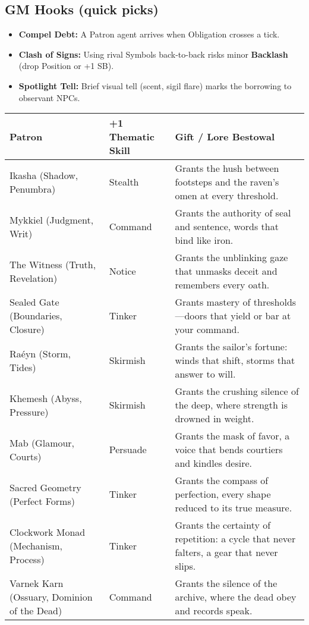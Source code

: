 \subsection*{GM Hooks (quick picks)}
\begin{itemize}
  \item \textbf{Compel Debt:} A Patron agent arrives when Obligation crosses a tick.
  \item \textbf{Clash of Signs:} Using rival Symbols back-to-back risks minor \textbf{Backlash} (drop Position or +1 SB).
  \item \textbf{Spotlight Tell:} Brief visual tell (scent, sigil flare) marks the borrowing to observant NPCs.
\end{itemize}

\begin{table}[H]
\centering
\renewcommand{\arraystretch}{1.15}
\begin{tabular}{@{}p{3.8cm}p{3.8cm}p{7.5cm}@{}}
\toprule
\textbf{Patron} & \textbf{+1 Thematic Skill} & \textbf{Gift / Lore Bestowal} \\
\midrule
Ikasha (Shadow, Penumbra) & Stealth & Grants the hush between footsteps and the raven’s omen at every threshold. \\
Mykkiel (Judgment, Writ) & Command & Grants the authority of seal and sentence, words that bind like iron. \\
The Witness (Truth, Revelation) & Notice & Grants the unblinking gaze that unmasks deceit and remembers every oath. \\
Sealed Gate (Boundaries, Closure) & Tinker & Grants mastery of thresholds—doors that yield or bar at your command. \\
Raéyn (Storm, Tides) & Skirmish & Grants the sailor’s fortune: winds that shift, storms that answer to will. \\
Khemesh (Abyss, Pressure) & Skirmish & Grants the crushing silence of the deep, where strength is drowned in weight. \\
Mab (Glamour, Courts) & Persuade & Grants the mask of favor, a voice that bends courtiers and kindles desire. \\
Sacred Geometry (Perfect Forms) & Tinker & Grants the compass of perfection, every shape reduced to its true measure. \\
Clockwork Monad (Mechanism, Process) & Tinker & Grants the certainty of repetition: a cycle that never falters, a gear that never slips. \\
Varnek Karn (Ossuary, Dominion of the Dead) & Command & Grants the silence of the archive, where the dead obey and records speak. \\

\end{tabular}
\end{table}
